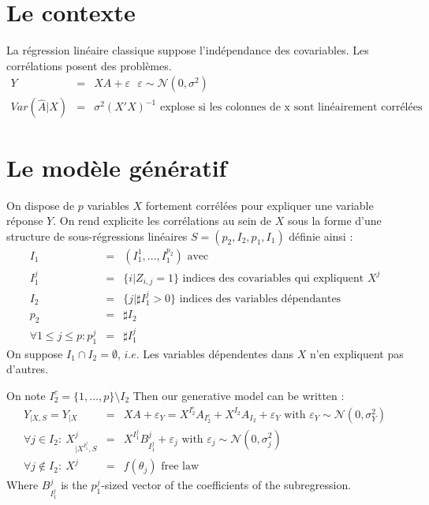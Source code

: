 \documentclass[12pt]{article}
\begin{document}

\section{Le contexte}
	La r\'egression lin\'eaire classique suppose l'ind\'ependance des covariables. Les corr\'elations posent des probl\`emes.
	\begin{eqnarray}
		Y&=&XA+\varepsilon \ \ \ \varepsilon\sim \mathcal{N}(0,\sigma^2) \\
		Var(\hat{A}|X)&=& \sigma^2(X'X)^{-1} \textrm{ explose si les colonnes de x sont lin\'eairement corr\'el\'ees}
	\end{eqnarray}
			
	
	
\section{Le mod\`ele g\'en\'eratif}
On dispose de $p$ variables $X$ fortement corr\'el\'ees pour expliquer une variable r\'eponse $Y$.
On rend explicite les corr\'elations au sein de $X$ sous la forme d'une structure de sous-r\'egressions lin\'eaires $S=(p_2,I_2,p_1,I_1)$ d\'efinie ainsi :
	\begin{eqnarray}
		I_1&=&(I_1^1,\dots,I_1^{p_2}) \textrm{ avec}		\\
		I_1^j &=& \{i |Z_{i,j}=1 \} \textrm{ indices des covariables qui expliquent $X^j$} \\
		I_2&=&\{j |\sharp I_1^j>0 \}  \textrm{ indices des variables d\'ependantes} \\
		p_2&=& \sharp I_2 \\
		\forall 1\leq j\leq p :  p_1^j&=&\sharp I_1^j
	\end{eqnarray}
	On suppose $I_1\cap I_2=\emptyset$, $i.e.$ Les variables d\'ependentes dans $X$ n'en expliquent pas d'autres. 
	
	On note $I_2^c=\{1,\dots,p\}\setminus I_2$
Then our generative model can be written :
\begin{eqnarray}
	Y_{|X,S}=Y_{|X}&=&XA+\varepsilon_Y= X^{I_2^c}A_{I_2^c}+X^{I_2}A_{I_2}+\varepsilon_Y \textrm{ with } \varepsilon_Y \sim \mathcal{N}(0,\sigma_Y^2) \label{MainR}\\
	\forall j \in I_2 : \  X^j_{|X^{I_1^j},S}&=&X^{I_1^j}B_{I_1^j}^j + \varepsilon_{j} \textrm{ with } \varepsilon_j \sim \mathcal{N}(0,\sigma_j^2) \label{SR}\\
    \forall j \notin I_2 : \ X^j &=& f(\theta_j) \textrm{ free law}	
\end{eqnarray}
Where $B_{I_1^j}^j$ is the $p_1^j$-sized vector of the coefficients of the subregression.
\end{document}
